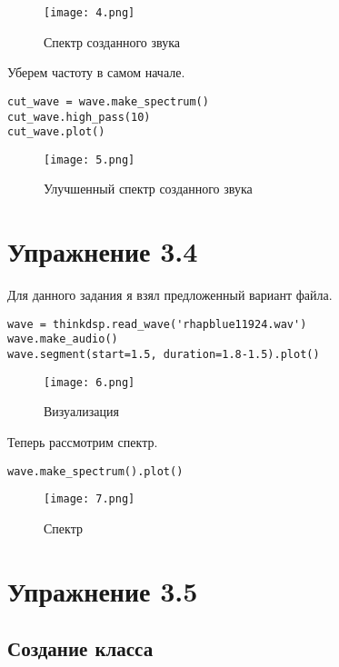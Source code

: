 \documentclass[a4paper,12pt]{report}
\begin{document}
\begin{figure}[H]
        \centering
        \texttt{[image: 4.png]}
        \caption{Спектр созданного звука}
        \label{fig:lab3_fig4}
\end{figure}


Уберем частоту в самом начале.

\begin{lstlisting}[caption=Удаление частоты в начале]
cut_wave = wave.make_spectrum()
cut_wave.high_pass(10)
cut_wave.plot()
\end{lstlisting}

\begin{figure}[H]
        \centering
        \texttt{[image: 5.png]}
        \caption{Улучшенный спектр созданного звука}
        \label{fig:lab3_fig5}
\end{figure}    

\chapter{Упражнение 3.4}

Для данного задания я взял предложенный вариант файла. 

\begin{lstlisting}[caption=Загрузка и визуализация]
wave = thinkdsp.read_wave('rhapblue11924.wav')
wave.make_audio()
wave.segment(start=1.5, duration=1.8-1.5).plot()
\end{lstlisting}

\begin{figure}[H]
        \centering
        \texttt{[image: 6.png]}
        \caption{Визуализация}
        \label{fig:lab3_fig6}
\end{figure}

Теперь рассмотрим спектр.

\begin{lstlisting}[caption=Спектр]
wave.make_spectrum().plot()
\end{lstlisting}

\begin{figure}[H]
        \centering
        \texttt{[image: 7.png]}
        \caption{Спектр}
        \label{fig:lab3_fig7}
\end{figure}


\chapter{Упражнение 3.5}
\section{Создание класса}
\end{document}
